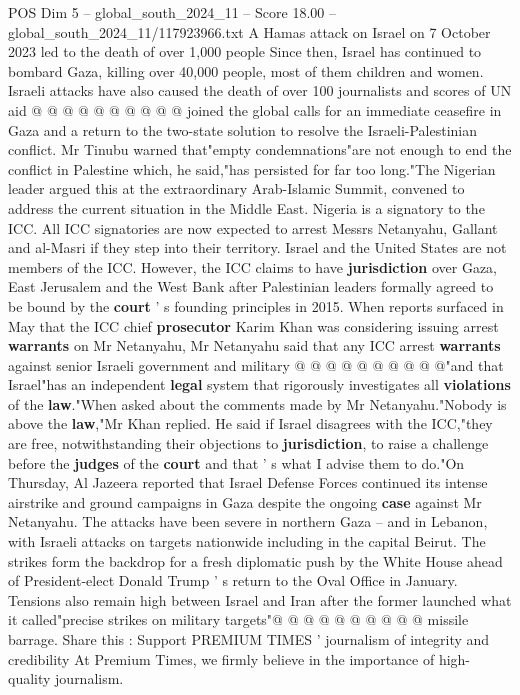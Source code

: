 \begin{textsample}{POS Dim 5 – global\_south\_2024\_11 – Score 18.00 – global\_south\_2024\_11/117923966.txt}
A Hamas attack on Israel on 7 October 2023 led to the death of over 1,000 people Since then, Israel has continued to bombard Gaza, killing over 40,000 people, most of them children and women.
Israeli attacks have also caused the death of over 100 journalists and scores of UN aid @ @ @ @ @ @ @ @ @ @ joined the global calls for an immediate ceasefire in Gaza and a return to the two-state solution to resolve the Israeli-Palestinian conflict.
Mr Tinubu warned that"empty condemnations"are not enough to end the conflict in Palestine which, he said,"has persisted for far too long."The Nigerian leader argued this at the extraordinary Arab-Islamic Summit, convened to address the current situation in the Middle East.
Nigeria is a signatory to the ICC.
All ICC signatories are now expected to arrest Messrs Netanyahu, Gallant and al-Masri if they step into their territory.
Israel and the United States are not members of the ICC.
However, the ICC claims to have \textbf{jurisdiction} over Gaza, East Jerusalem and the West Bank after Palestinian leaders formally agreed to be bound by the \textbf{court} ' s founding principles in 2015.
When reports surfaced in May that the ICC chief \textbf{prosecutor} Karim Khan was considering issuing arrest \textbf{warrants} on Mr Netanyahu, Mr Netanyahu said that any ICC arrest \textbf{warrants} against senior Israeli government and military @ @ @ @ @ @ @ @ @ @"and that Israel"has an independent \textbf{legal} system that rigorously investigates all \textbf{violations} of the \textbf{law}."When asked about the comments made by Mr Netanyahu."Nobody is above the \textbf{law},"Mr Khan replied.
He said if Israel disagrees with the ICC,"they are free, notwithstanding their objections to \textbf{jurisdiction}, to raise a challenge before the \textbf{judges} of the \textbf{court} and that ' s what I advise them to do."On Thursday, Al Jazeera reported that Israel Defense Forces continued its intense airstrike and ground campaigns in Gaza despite the ongoing \textbf{case} against Mr Netanyahu.
The attacks have been severe in northern Gaza -- and in Lebanon, with Israeli attacks on targets nationwide including in the capital Beirut.
The strikes form the backdrop for a fresh diplomatic push by the White House ahead of President-elect Donald Trump ' s return to the Oval Office in January.
Tensions also remain high between Israel and Iran after the former launched what it called"precise strikes on military targets"@ @ @ @ @ @ @ @ @ @ missile barrage.
Share this : Support PREMIUM TIMES ' journalism of integrity and credibility At Premium Times, we firmly believe in the importance of high-quality journalism.

\end{textsample}
